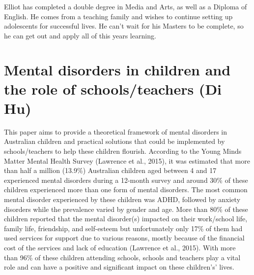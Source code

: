 \documentclass[twoside,14pt,a4paper,notitlepage]{memoir}
\begin{document}
Elliot has completed a double degree in Media and Arts, as well as a Diploma of English. He comes from a teaching family and wishes to continue setting up adolescents for successful lives. He can’t wait for his Masters to be complete, so he can get out and apply all of this years learning.



\section*{Mental disorders in children and the role of schools/teachers (Di Hu)}
\label{aut:hu}

This paper aims to provide a theoretical framework of mental disorders in Australian children and practical solutions that could be implemented by schools/teachers to help these children flourish. According to the Young Minds Matter Mental Health Survey (Lawrence et al., 2015), it was estimated that more than half a million (13.9\%) Australian children aged between 4 and 17 experienced mental disorders during a 12-month survey and around 30\% of these children experienced more than one form of mental disorders. The most common mental disorder experienced by these children was ADHD, followed by anxiety disorders while the prevalence varied by gender and age. More than 80\% of these children reported that the mental disorder(s) impacted on their work/school life, family life, friendship, and self-esteem but unfortunately only 17\% of them had used services for support due to various reasons, mostly because of the financial cost of the services and lack of education (Lawrence et al., 2015). With more than 96\% of these children attending schools, schools and teachers play a vital role and can have a positive and significant impact on these children’s’ lives.
\end{document}

